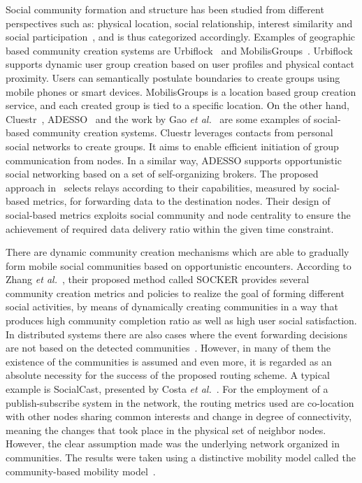 Social community formation and structure has been studied from different perspectives such as: physical location, social relationship, interest similarity and social participation~\cite{DZhang2011}\cite{EGBoix2011}, and is thus categorized accordingly. Examples of geographic based community creation systems are Urbiflock~\cite{EGBoix2011} and MobilisGroups~\cite{RLubke2011}.  Urbiflock supports dynamic user group creation based on user profiles and physical contact proximity. Users can semantically postulate boundaries to create groups using mobile phones or smart devices. MobilisGroups is a location based group creation service, and each created group is tied to a specific location. On the other hand, Cluestr~\cite{RGrob2009}, ADESSO~\cite{SBMokhtar2010} and the work by Gao {\it et al.}~\cite{WGao2012} are some examples of social-based community creation systems. Cluestr leverages contacts from personal social networks to create groups. It aims to enable efficient initiation of group communication from nodes. In a similar way, ADESSO supports opportunistic social networking based on a set of self-organizing brokers. The proposed approach in~\cite{WGao2012} selects relays according to their capabilities, measured by social-based metrics, for forwarding data to the destination nodes. Their design of social-based metrics exploits social community and node centrality to ensure the achievement of required data delivery ratio within the given time constraint.

There are dynamic community creation mechanisms which are able to gradually form mobile social communities based on opportunistic encounters. According to Zhang {\it et al.}~\cite{DZhang2011}, their proposed method called SOCKER provides several community creation metrics and policies to realize the goal of forming different social activities, by means of dynamically creating communities in a way that produces high community completion ratio as well as high user social satisfaction. In distributed systems there are also cases where the event forwarding decisions are not based on the detected communities~\cite{NVastardis2013}. However, in many of them the existence of the communities is assumed and even more, it is regarded as an absolute necessity for the success of the proposed routing scheme. A typical example is SocialCast, presented by Costa {\it et al.}~\cite{PCosta2008}. For the employment of a publish-subscribe system in the network, the routing metrics used are co-location with other nodes sharing common interests and change in degree of connectivity, meaning the changes that took place in the physical set of neighbor nodes. However, the clear assumption made was the underlying network organized in communities. The results were taken using a distinctive mobility model called the community-based mobility model~\cite{MMusolesi2004}.

